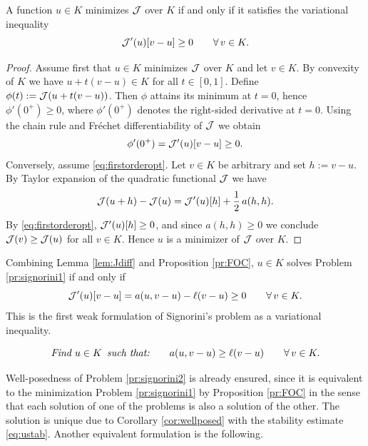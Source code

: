 \begin{proposition}\label{pr:FOC}
	A function $u\in K$ minimizes ${\mathcal J}$ over $K$ if and only if it satisfies the variational inequality
	\begin{equation}\label{eq:firstorderopt}
		{\mathcal J}^\prime(u)[v-u]\ge 0\qquad\forall\, v\in K.
	\end{equation}
\end{proposition}
\begin{proof}
	Assume first that $u\in K$ minimizes ${\mathcal J}$ over $K$ and let $v\in K$.
	By convexity of $K$ we have $u+t(v-u)\in K$ for all $t\in[0,1]$.
	Define $\phi(t):={\mathcal J}(u+t(v-u))$. Then $\phi$ attains its minimum at $t=0$, hence $\phi'(0^+)\ge 0$, where $\phi'(0^+)$ denotes the right-sided derivative at $t=0$. Using the chain rule and Fréchet differentiability of ${\mathcal J}$ we obtain
	\begin{equation*}
		\phi'(0^+)={\mathcal J}'(u)[v-u]\ge 0.
	\end{equation*}
	Conversely, assume \eqref{eq:firstorderopt}. Let $v\in K$ be arbitrary and set $h:=v-u$. By Taylor expansion of the quadratic functional ${\mathcal J}$ we have
	\begin{equation*}
		{\mathcal J}(u+h)-{\mathcal J}(u)={\mathcal J}'(u)[h]+\frac12\,a(h,h).
	\end{equation*}
	By \eqref{eq:firstorderopt}, ${\mathcal J}'(u)[h]\ge 0$, and since $a(h,h)\ge 0$ we conclude ${\mathcal J}(v)\ge {\mathcal J}(u)$ for all $v\in K$. Hence $u$ is a minimizer of ${\mathcal J}$ over $K$.
\end{proof}

Combining Lemma \ref{lem:Jdiff} and Proposition \ref{pr:FOC}, $u\in K$ solves Problem \ref{pr:signorini1} if and only if
\begin{equation*}
	{\mathcal J}^\prime(u)[v-u] = a(u,v-u)-\ell(v-u)\ge 0 \qquad \forall\, v\in K.
\end{equation*}
This is the first weak formulation of Signorini's problem as a variational inequality.

\begin{problem}\label{pr:signorini2}
\begin{equation*}
	\text{\em Find } u\in K\text{\em\enspace such that:}\qquad a(u,v-u)\ge \ell(v-u)\qquad \forall\, v\in K.
\end{equation*}
\end{problem}

Well-posedness of Problem \ref{pr:signorini2} is already ensured, since it is equivalent to the minimization Problem \ref{pr:signorini1} by Proposition \ref{pr:FOC} in the sense that each solution of one of the problems is also a solution of the other. The solution is unique due to Corollary \ref{cor:wellposed} with the stability estimate \eqref{eq:ustab}. Another equivalent formulation is the following.

